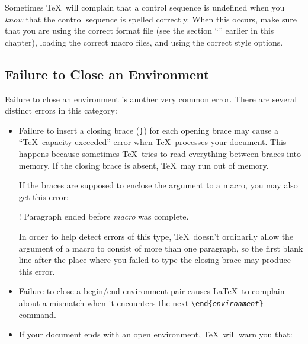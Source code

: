 Sometimes \TeX\ will complain that a control sequence is undefined
when you {\em know\/} that the control sequence is spelled correctly.
When this occurs, make sure that you are using the correct format file
(see the section ``'' earlier in this chapter),
loading the correct macro files, and using
the correct style options.

\subsection{Failure to Close an Environment}

Failure to close an environment is 
another very common error.  There
are several distinct errors in this category:

\begin{itemize}
  \item Failure to insert a closing brace (\verb|}|) for each opening
        brace may cause a ``\TeX\ capacity exceeded'' error when \TeX\ 
        processes
        your document.  This happens because sometimes \TeX\ tries to read 
        everything
        between braces into memory.  If the closing brace is absent, \TeX\
        may run out of memory.

        If the braces are supposed to enclose the argument to a macro,
        you may also get this error:

\begin{ttindent}
! Paragraph ended before \textit{macro} was complete.
\end{ttindent}

        In order to help detect errors of this type, \TeX\ doesn't ordinarily
        allow the argument of a macro to consist of more than one paragraph,
        so the first blank line after the place where you failed to type
        the closing brace may produce this error.

  \item Failure to close a begin/end environment pair
        causes \LaTeX\ to complain about a mismatch when it encounters
        the next \verb|\end{|\texttt{\textit{environment}}\verb|}|
        command.

  \item If your document ends with an open environment, \TeX\ will warn
        you that:


\end{itemize}
